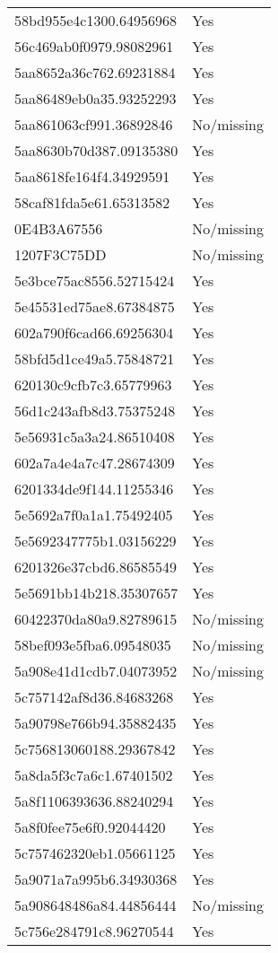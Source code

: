 \begin{tabular}{ll}
58bd955e4c1300.64956968 & Yes \\
56c469ab0f0979.98082961 & Yes \\
5aa8652a36c762.69231884 & Yes \\
5aa86489eb0a35.93252293 & Yes \\
5aa861063cf991.36892846 & No/missing \\
5aa8630b70d387.09135380 & Yes \\
5aa8618fe164f4.34929591 & Yes \\
58caf81fda5e61.65313582 & Yes \\
0E4B3A67556 & No/missing \\
1207F3C75DD & No/missing \\
5e3bce75ac8556.52715424 & Yes \\
5e45531ed75ae8.67384875 & Yes \\
602a790f6cad66.69256304 & Yes \\
58bfd5d1ce49a5.75848721 & Yes \\
620130c9cfb7c3.65779963 & Yes \\
56d1c243afb8d3.75375248 & Yes \\
5e56931c5a3a24.86510408 & Yes \\
602a7a4e4a7c47.28674309 & Yes \\
6201334de9f144.11255346 & Yes \\
5e5692a7f0a1a1.75492405 & Yes \\
5e5692347775b1.03156229 & Yes \\
6201326e37cbd6.86585549 & Yes \\
5e5691bb14b218.35307657 & Yes \\
60422370da80a9.82789615 & No/missing \\
58bef093e5fba6.09548035 & No/missing \\
5a908e41d1cdb7.04073952 & No/missing \\
5c757142af8d36.84683268 & Yes \\
5a90798e766b94.35882435 & Yes \\
5c756813060188.29367842 & Yes \\
5a8da5f3c7a6c1.67401502 & Yes \\
5a8f1106393636.88240294 & Yes \\
5a8f0fee75e6f0.92044420 & Yes \\
5c757462320eb1.05661125 & Yes \\
5a9071a7a995b6.34930368 & Yes \\
5a908648486a84.44856444 & No/missing \\
5c756e284791c8.96270544 & Yes \\

\end{tabular}
